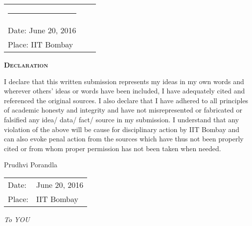 \vspace{5mm}
\begin{tabular}{lll}
	\rule{40mm}{0pt}        & \rule{50mm}{0pt}       & \rule{60mm}{0pt} \\
	Date: June 20, 2016		&                        & \\
	Place: IIT Bombay       &                        & \\
\end{tabular}
\newpage
\thispagestyle{empty}
\begin{center}
	\begin{Huge}
		\textsc{\textbf{Declaration}}
	\end{Huge}
\end{center}

\vspace{0.5in}

 I declare that this written submission represents my ideas in my own words and wherever others' ideas or words have been included, I have adequately cited and referenced the original sources. I also declare that I have adhered to all principles of academic honesty and integrity and have not misrepresented or fabricated or falsified any idea/ data/ fact/ source in my submission. I understand that any violation of the above will be cause for disciplinary action by IIT Bombay and can also evoke penal action from the sources which have thus not been properly cited or from whom proper permission has not been taken when needed.

\vspace{1.5in}
	\hfill Prudhvi Porandla\\
	\noindent
	\begin{tabular}{ll}
		Date: & June 20, 2016\\ \vspace{30pt}
		Place: & IIT Bombay\\
	\end{tabular}

		\newpage
		\thispagestyle{empty}    %

		\begin{center}  \null\vfill
			\textit{\Large To YOU}
			\null\vfill
		\end{center}



